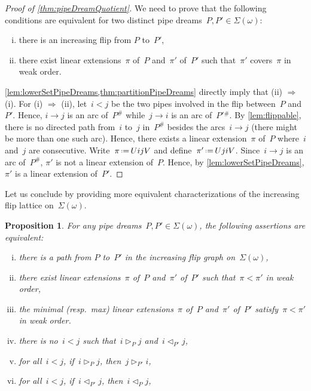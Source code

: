 \documentclass[reqno]{amsart}
\newtheorem{proposition}[theorem]{Proposition}
\theoremstyle{definition}
\newcommand{\eqdef}{\mbox{\,\raisebox{0.2ex}{\scriptsize\ensuremath{\mathrm:}}\ensuremath{=}\,}} %
\newcommand{\contact}{^\#} %
\newcommand{\acyclicPipeDreams}{\Sigma} %
\newcommand{\less}{\vartriangleleft} %
\newcommand{\more}{\vartriangleright} %
\newcommand{\contactLess}[1]{\less_{#1}} %
\newcommand{\contactMore}[1]{\more_{#1}} %
\begin{document}
\begin{proof}[Proof of \cref{thm:pipeDreamQuotient}]
We need to prove that the following conditions are equivalent for two distinct pipe dreams~$P,P' \in \acyclicPipeDreams(\omega)$:
\begin{enumerate}[(i)]
\item there is an increasing flip from $P$ to~$P'$,
\item there exist linear extensions~$\pi$ of~$P$ and~$\pi'$ of~$P'$ such that~$\pi'$ covers~$\pi$ in weak order.
\end{enumerate}
\cref{lem:lowerSetPipeDreams,thm:partitionPipeDreams} directly imply that (ii) $\Rightarrow$ (i).
For (i) $\Rightarrow$ (ii), let~$i < j$ be the two pipes involved in the flip between~$P$ and~$P'$.
Hence, $i \to j$ is an arc of~$P\contact$ while~$j \to i$ is an arc of~$P'{}\contact$.
By \cref{lem:flippable}, there is no directed path from~$i$ to~$j$ in~$P\contact$ besides the arcs~$i \to j$ (there might be more than one such arc).
Hence, there exists a linear extension~$\pi$ of~$P$ where~$i$ and~$j$ are consecutive.
Write~$\pi \eqdef UijV$ and define~$\pi' \eqdef UjiV$.
Since~$i \to j$ is an arc of~$P\contact$, $\pi'$ is not a linear extension of~$P$.
Hence, by \cref{lem:lowerSetPipeDreams}, $\pi'$ is a linear extension of~$P'$.
\end{proof}

Let us conclude by providing more equivalent characterizations of the increasing flip lattice on~$\acyclicPipeDreams(\omega)$.

\begin{proposition}
For any pipe dreams~$P, P' \in \acyclicPipeDreams(\omega)$, the following assertions are equivalent:
\begin{enumerate}[(i)]
\item there is a path from $P$ to~$P'$ in the increasing flip graph on~$\acyclicPipeDreams(\omega)$,
\item there exist linear extensions~$\pi$ of~$P$ and~$\pi'$ of~$P'$ such that~$\pi < \pi'$ in weak order,
\item the minimal (resp.~max) linear extensions~$\pi$ of~$P$ and~$\pi'$ of~$P'$ satisfy~$\pi < \pi'$ in weak order.
\item there is no~$i < j$ such that~$i \contactMore{P} j$ and~$i \contactLess{P'} j$,
\item for all~$i < j$, if~$i \contactMore{P} j$, then~$j \contactMore{P'} i$,
\item for all~$i < j$, if~$i \contactLess{P'} j$, then~$i \contactLess{P} j$,
\end{enumerate}
\end{proposition}
\end{document}
